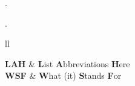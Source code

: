 \documentclass[
11pt, %
oneside, %
english, %
, %
headsepline, %
]{MastersDoctoralThesis} %
\begin{document}

%


\vspace*{0.2\textheight}





\newpage
.



\newpage
.





\setcounter{tocdepth}{2}
\tableofcontents %

\listoffigures %

\listoftables %

\iffalse
\begin{abbreviations}{ll} %

\textbf{LAH} & \textbf{L}ist \textbf{A}bbreviations \textbf{H}ere\\
\textbf{WSF} & \textbf{W}hat (it) \textbf{S}tands \textbf{F}or\\

\end{abbreviations}
\end{document}
